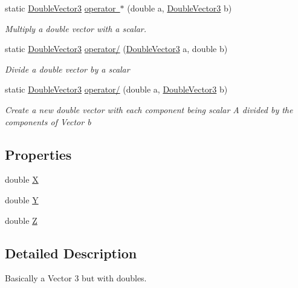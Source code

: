 \begin{DoxyCompactItemize}
static \mbox{\hyperlink{class_double_vector3}{Double\+Vector3}} \mbox{\hyperlink{class_double_vector3_a7188798234df06b15e0c6946285e02b8}{operator $\ast$}} (double a, \mbox{\hyperlink{class_double_vector3}{Double\+Vector3}} b)
\begin{DoxyCompactList}\small\item\em Multiply a double vector with a scalar. \end{DoxyCompactList}\item 
static \mbox{\hyperlink{class_double_vector3}{Double\+Vector3}} \mbox{\hyperlink{class_double_vector3_a069bc62ef684c5ed1bfca92ec0820932}{operator/}} (\mbox{\hyperlink{class_double_vector3}{Double\+Vector3}} a, double b)
\begin{DoxyCompactList}\small\item\em Divide a double vector by a scalar \end{DoxyCompactList}\item 
static \mbox{\hyperlink{class_double_vector3}{Double\+Vector3}} \mbox{\hyperlink{class_double_vector3_aacc1881f47ec834f4bcf25b84a1fe8de}{operator/}} (double a, \mbox{\hyperlink{class_double_vector3}{Double\+Vector3}} b)
\begin{DoxyCompactList}\small\item\em Create a new double vector with each component being scalar A divided by the components of Vector b \end{DoxyCompactList}\end{DoxyCompactItemize}
\subsection*{Properties}
\begin{DoxyCompactItemize}
\item 
double \mbox{\hyperlink{class_double_vector3_a222624a0d77d108f21221e472ac08f05}{X}}
\item 
double \mbox{\hyperlink{class_double_vector3_a47fffe514be07e27f35e24614f2dff89}{Y}}
\item 
double \mbox{\hyperlink{class_double_vector3_adcedb2cef768d9ab7d10f27f58da9d35}{Z}}
\end{DoxyCompactItemize}


\subsection{Detailed Description}
Basically a Vector 3 but with doubles. 



